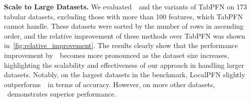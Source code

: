 \textbf{Scale to Large Datasets.} We evaluated~\name~and the variants of TabPFN on 173 tabular datasets, excluding those with more than 100 features, which TabPFN cannot handle. These datasets were sorted by the number of rows in ascending order, and the relative improvement of these methods over TabPFN was shown in~\autoref{fig:relative_improvement}. The results clearly show that the performance improvement by~\name~becomes more pronounced as the dataset size increases, highlighting the scalability and effectiveness of our approach in handling larger datasets. Notably, on the largest datasets in the benchmark, LocalPFN slightly outperforms~\name~in terms of accuracy. However, on more other datasets, \name~demonstrates superior performance. 


